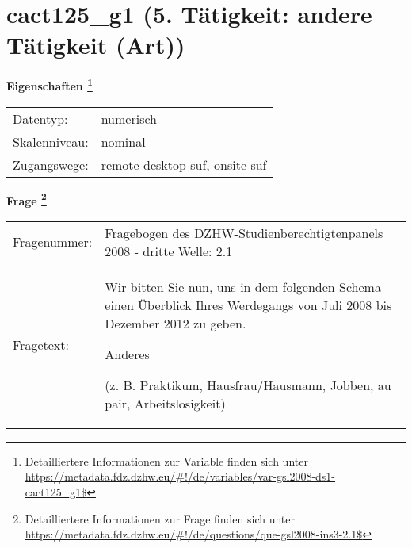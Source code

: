 
    \setcounter{footnote}{0}

    \vspace*{-1.8cm}
	\section{cact125\_g1 (5. Tätigkeit: andere Tätigkeit (Art))}
	\label{section:cact125_g1}



    \vspace*{0.5cm}
    \noindent\textbf{Eigenschaften
	\footnote{Detailliertere Informationen zur Variable finden sich unter
		\url{https://metadata.fdz.dzhw.eu/\#!/de/variables/var-gsl2008-ds1-cact125_g1$}}}\\
	\begin{tabularx}{\hsize}{@{}lX}
	Datentyp: & numerisch \\
	Skalenniveau: & nominal \\
	Zugangswege: &
	  remote-desktop-suf, 
	  onsite-suf
 \\
    \end{tabularx}



				\vspace*{0.5cm}
                \noindent\textbf{Frage
	                \footnote{Detailliertere Informationen zur Frage finden sich unter
		              \url{https://metadata.fdz.dzhw.eu/\#!/de/questions/que-gsl2008-ins3-2.1$}}}\\
				\begin{tabularx}{\hsize}{@{}lX}
					Fragenummer: &
					  Fragebogen des DZHW-Studienberechtigtenpanels 2008 - dritte Welle:
					  2.1
 \\
					Fragetext: & Wir bitten Sie nun, uns in dem folgenden Schema einen Überblick Ihres Werdegangs von Juli 2008 bis Dezember 2012 zu geben.\par  Anderes\par  (z. B. Praktikum, Hausfrau/Hausmann, Jobben, au pair, Arbeitslosigkeit) \\
				\end{tabularx}





